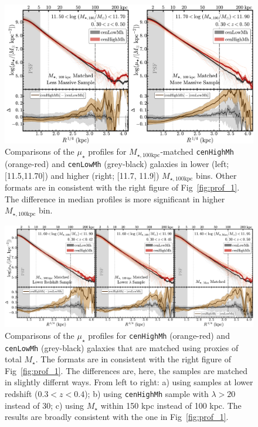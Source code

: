 \documentclass[a4paper,fleqn,usenatbib]{mnras}
\def\rbcg{\texttt{cenHighMh}}
\def\nbcg{\texttt{cenLowMh}}
\def\mstar{{$M_{\star}$}}
\def\mtot{{$M_{\star,100\mathrm{kpc}}$}}
\def\mden{{$\mu_{\star}$}}
\begin{document}
  \begin{figure}
      \centering 
      \includegraphics[width=15.5cm]{fig/redbcg_prof_2}
      \caption{
          Comparisons of the \mden{} profiles for \mtot{}-matched \rbcg{} 
          (orange-red) and \nbcg{} (grey-black) galaxies in lower (left; [11.5,11.70]) 
          and higher (right; [11.7, 11.9]) \mtot{} bins. 
          Other formats are in consistent with the right figure of Fig~\ref{fig:prof_1}.
          The difference in median profiles is more significant in higher \mtot{} bin.
          }
      \label{fig:prof_2}
  \end{figure}

  \begin{figure}
      \centering 
      \includegraphics[width=\textwidth]{fig/redbcg_prof_3}
      \caption{
        Comparisons of the \mden{} profiles for \rbcg{} (orange-red) and \nbcg{} 
      	(grey-black) galaxies that are matched using proxies of total \mstar{}. 
        The formats are in consistent with the right figure of Fig~\ref{fig:prof_1}.
        The differences are, here, the samples are matched in slightly differnt ways. 
        From left to right: a) using samples at lower redshift ($0.3 < z < 0.4$); 
        b) using \rbcg{} sample with $\lambda > 20$ instead of 30; 
        c) using \mstar{} within 150 kpc instead of 100 kpc.
        The results are broadly consistent with the one in Fig~\ref{fig:prof_1}.
        }
      \label{fig:prof_3} 
  \end{figure}
\end{document}
